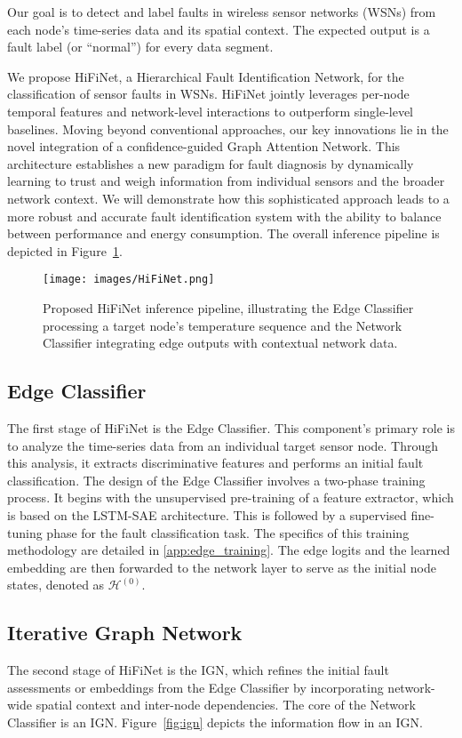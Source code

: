Our goal is to detect and label faults in wireless sensor networks (WSNs) from each node’s time-series data and its spatial context. The expected output is a fault label (or “normal”) for every data segment.

We propose HiFiNet, a Hierarchical Fault Identification Network, for the classification of sensor faults in WSNs. HiFiNet jointly leverages per-node temporal features and network‐level interactions to outperform single-level baselines. Moving beyond conventional approaches, our key innovations lie in the novel integration of a confidence-guided Graph Attention Network. This architecture establishes a new paradigm for fault diagnosis by dynamically learning to trust and weigh information from individual sensors and the broader network context. We will demonstrate how this sophisticated approach leads to a more robust and accurate fault identification system with the ability to balance between performance and energy consumption. The overall inference pipeline is depicted in Figure~\ref{fig:hifinet}.

\begin{figure}
  \centering
  \texttt{[image: images/HiFiNet.png]}
  \caption{Proposed HiFiNet inference pipeline, illustrating the Edge Classifier processing a target node's temperature sequence and the Network Classifier integrating edge outputs with contextual network data.}
  \label{fig:hifinet}
\end{figure}

\subsection{Edge Classifier}
The first stage of HiFiNet is the Edge Classifier. This component's primary role is to analyze the time-series data from an individual target sensor node. Through this analysis, it extracts discriminative features and performs an initial fault classification. The design of the Edge Classifier involves a two-phase training process. It begins with the unsupervised pre-training of a feature extractor, which is based on the LSTM-SAE architecture. This is followed by a supervised fine-tuning phase for the fault classification task. The specifics of this training methodology are detailed in \ref{app:edge_training}. The edge logits and the learned embedding are then forwarded to the network layer to serve as the initial node states, denoted as \(\mathcal{H}^{(0)}\).

\subsection{Iterative Graph Network}
The second stage of HiFiNet is the IGN, which refines the initial fault assessments or embeddings from the Edge Classifier by incorporating network-wide spatial context and inter-node dependencies. The core of the Network Classifier is an IGN. Figure~\ref{fig:ign} depicts the information flow in an IGN.

